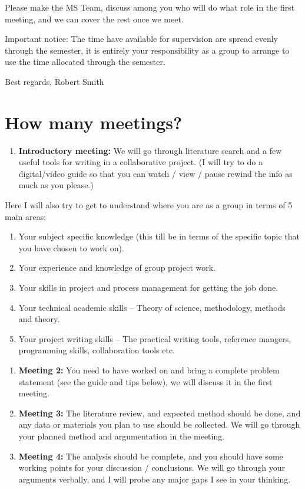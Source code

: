 \documentclass[
]{book}
\providecommand{\tightlist}{%
  \setlength{\itemsep}{0pt}\setlength{\parskip}{0pt}}
\begin{document}
Please make the MS Team, discuss among you who will do what role in the first meeting, and we can cover the rest once we meet.

Important notice:
The time have available for supervision are spread evenly through the semester, it is entirely your responsibility as a group to arrange to use the time allocated through the semester.

Best regards,
Robert Smith

\hypertarget{how-many-meetings}{%
\section{How many meetings?}\label{how-many-meetings}}

\begin{enumerate}
\def\labelenumi{\arabic{enumi}.}
\tightlist
\item
  \textbf{Introductory meeting:} We will go through literature search and a
  few useful tools for writing in a collaborative project. (I will try to
  do a digital/video guide so that you can watch / view / pause rewind the
  info as much as you please.)
\end{enumerate}

Here I will also try to get to understand where you are as a group in
terms of 5 main areas:

\begin{enumerate}
\def\labelenumi{\alph{enumi}.}
\item
  Your subject specific knowledge (this till be in terms of the
  specific topic that you have chosen to work on).
\item
  Your experience and knowledge of group project work.
\item
  Your skills in project and process management for getting the job
  done.
\item
  Your technical academic skills -- Theory of science, methodology,
  methods and theory.
\item
  Your project writing skills -- The practical writing tools,
  reference mangers, programming skills, collaboration tools etc.
\end{enumerate}

\begin{enumerate}
\def\labelenumi{\arabic{enumi}.}
\setcounter{enumi}{1}
\item
  \textbf{Meeting 2:} You need to have worked on and bring a complete
  problem statement (see the guide and tips below), we will discuss it in
  the first meeting.
\item
  \textbf{Meeting 3:} The literature review, and expected method should be
  done, and any data or materials you plan to use should be collected. We
  will go through your planned method and argumentation in the meeting.
\item
  \textbf{Meeting 4:} The analysis should be complete, and you should have
  some working points for your discussion / conclusions. We will go
  through your arguments verbally, and I will probe any major gaps I see
  in your thinking.
\end{enumerate}
\end{document}
